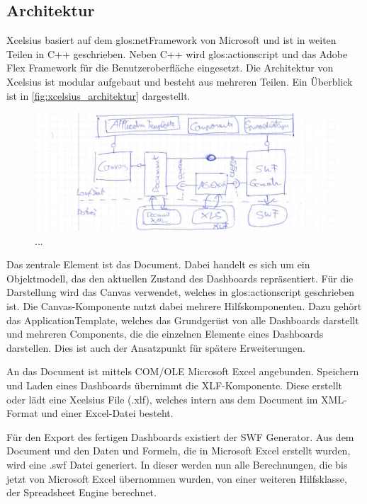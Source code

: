 \begin{onehalfspacing}
\subsection{Architektur} 
\gls{Xcelsius} basiert auf dem \gls{glos:netFramework} von Microsoft und ist in weiten Teilen in C++ geschrieben. Neben C++ wird \gls{glos:actionscript} und das Adobe Flex Framework für die  Benutzeroberfläche eingesetzt. Die Architektur von \gls{Xcelsius} ist modular aufgebaut und besteht aus mehreren Teilen. Ein Überblick ist in \vref{fig:xcelsius_architektur} dargestellt.

\begin{figure}[h]
\centering
\setlength{\unitlength}{1mm}
\includegraphics[width=15cm]{images/Xcelsius_Architecture.jpg}
\caption{...\label{fig:xcelsius_architektur}}
\end{figure}  

Das zentrale Element ist das Document. Dabei handelt es sich um ein Objektmodell, das den aktuellen Zustand des Dashboards repräsentiert. Für die Darstellung wird das Canvas verwendet, welches in \gls{glos:actionscript} geschrieben ist. Die Canvas-Komponente nutzt dabei mehrere Hilfskomponenten. Dazu gehört das ApplicationTemplate, welches das Grundgerüst von alle Dashboards darstellt und mehreren Components, die die einzelnen Elemente eines Dashboards darstellen. Dies ist auch der Ansatzpunkt für spätere Erweiterungen.

An das Document ist mittels COM/OLE Microsoft Excel angebunden. Speichern und Laden eines Dashboards übernimmt die XLF-Komponente. Diese erstellt oder lädt eine \gls{Xcelsius} File (.xlf), welches intern aus dem Document im \gls{XML}-Format und einer Excel-Datei besteht.

Für den Export des fertigen Dashboards existiert der SWF Generator. Aus dem Document und den Daten und Formeln, die in Microsoft Excel erstellt wurden, wird eine .swf Datei generiert. In dieser werden nun alle Berechnungen, die bis jetzt von Microsoft Excel übernommen wurden, von einer weiteren Hilfsklasse, der Spreadsheet Engine berechnet.


\end{onehalfspacing}
